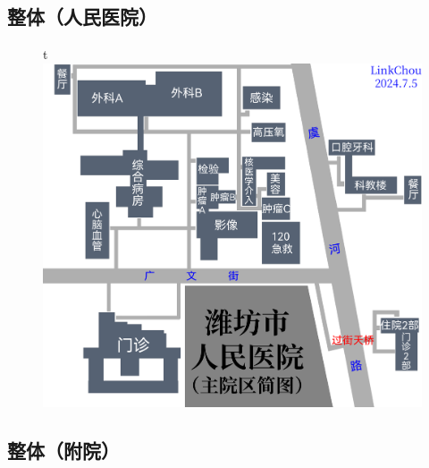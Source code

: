 \subsection[整体（人民医院）]{整体（人民医院）}
\begin{figure}[H]
    \centering
    \vspace{8em}
    t\includegraphics*[width=\linewidth]{resources/map/人民医院.pdf}
    \label{map_yuhe_renmin_hospital}
\end{figure}

\newpage
\subsection[整体（附院）]{整体（附院）}
\begin{figure}[H]
\end{figure}

\newpage